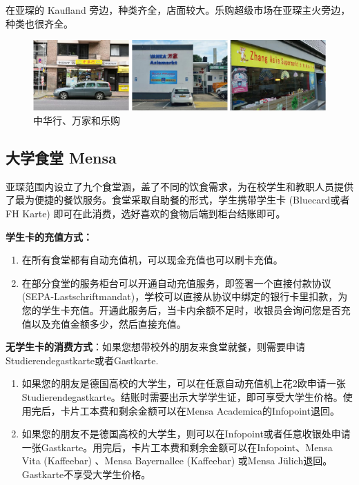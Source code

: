     \href{https://homeasia.de/}{} 在亚琛的 Kaufland 旁边，种类齐全，店面较大。乐购超级市场在亚琛主火旁边，种类也很齐全。

    \begin{figure}[ht]
      \centering
      \includegraphics[width=.9\textwidth]{在亚琛学习和生活/日常消费和饮食/中华行、万家和乐购.png}
      \caption{中华行、万家和乐购}
      \label{fig:中华行、万家和乐购}
    \end{figure}

  \subsection{大学食堂 Mensa}\label{subsec:大学食堂 Mensa}

    亚琛范围内设立了九个食堂涵，盖了不同的饮食需求，为在校学生和教职人员提供了最为便捷的餐饮服务。食堂采取自助餐的形式，学生携带学生卡 (Bluecard或者FH Karte) 即可在此消费，选好喜欢的食物后端到柜台结账即可。

    \textbf{学生卡的充值方式：}
    \begin{enumerate}
      \item 在所有食堂都有自动充值机，可以现金充值也可以刷卡充值。
      \item 在部分食堂的服务柜台可以开通自动充值服务，即签署一个直接付款协议 (SEPA-Lastschriftmandat)，学校可以直接从协议中绑定的银行卡里扣款，为您的学生卡充值。开通此服务后，当卡内余额不足时，收银员会询问您是否充值以及充值金额多少，然后直接充值。
    \end{enumerate}

    \textbf{无学生卡的消费方式}：如果您想带校外的朋友来食堂就餐，则需要申请Studierendegastkarte或者Gastkarte. 
    \begin{enumerate}
      \item 如果您的朋友是德国高校的大学生，可以在任意自动充值机上花2欧申请一张Studierendegastkarte。结账时需要出示大学学生证，即可享受大学生价格。使用完后，卡片工本费和剩余金额可以在Mensa Academica的Infopoint退回。
      \item 如果您的朋友不是德国高校的大学生，则可以在Infopoint或者任意收银处申请一张Gastkarte。用完后，卡片工本费和剩余金额可以在Infopoint、Mensa Vita (Kaffeebar) 、Mensa Bayernallee (Kaffeebar) 或Mensa Jülich退回。Gastkarte不享受大学生价格。
    \end{enumerate}
    
